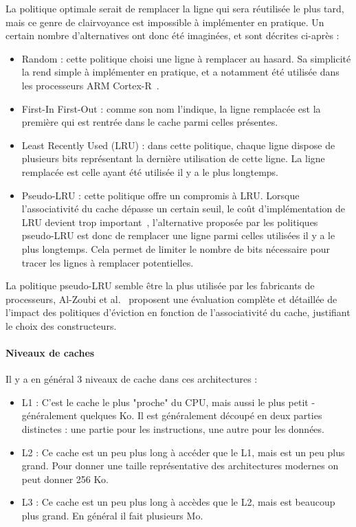 La politique optimale serait de remplacer la ligne qui sera réutilisée le plus tard, mais ce genre de clairvoyance est impossible à implémenter en pratique.
Un certain nombre d'alternatives ont donc été imaginées, et sont décrites ci-après :
\begin{itemize}
  \item Random : cette politique choisi une ligne à remplacer au hasard. Sa simplicité la rend simple à implémenter en pratique, et a notamment été utilisée dans les processeurs ARM Cortex-R~\cite{ARM-Cortex-R}.
  \item First-In First-Out : comme son nom l'indique, la ligne remplacée est la première qui est rentrée dans le cache parmi celles présentes.
  \item Least Recently Used (LRU) : dans cette politique, chaque ligne dispose de plusieurs bits représentant la dernière utilisation de cette ligne. La ligne remplacée est celle ayant été utilisée il y a le plus longtemps.
  \item Pseudo-LRU : cette politique offre un compromis à LRU.
Lorsque l'associativité du cache dépasse un certain seuil, le coût d'implémentation de LRU devient trop important~\cite{Kedzierski2010}, l'alternative proposée par les politiques pseudo-LRU est donc de remplacer une ligne parmi celles utilisées il y a le plus longtemps.
Cela permet de limiter le nombre de bits nécessaire pour tracer les lignes à remplacer potentielles.
\end{itemize}

La politique pseudo-LRU semble être la plus utilisée par les fabricants de processeurs, Al-Zoubi et al.~\cite{Al-Zoubi2004} proposent une évaluation complète et détaillée de l'impact des politiques d'éviction en fonction de l'associativité du cache, justifiant le choix des constructeurs.

\paragraph{Niveaux de caches}

Il y a en général 3 niveaux de cache dans ces architectures :
\begin{itemize}
  \item L1 : C'est le cache le plus "proche" du CPU, mais aussi le plus petit - généralement quelques Ko. Il est généralement découpé en deux parties distinctes : une partie pour les instructions, une autre pour les données.
  \item L2 : Ce cache est un peu plus long à accéder que le L1, mais est un peu plus grand. Pour donner une taille représentative des architectures modernes on peut donner 256 Ko.
  \item L3 : Ce cache est un peu plus long à accèdes que le L2, mais est beaucoup plus grand. En général il fait plusieurs Mo.
\end{itemize}

